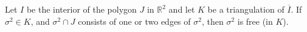 Let $I$ be the interior of the polygon $J$ in $\mathbb{R}^2$ and let $K$ be a triangulation of $\overline{I}$. If $\sigma^2 \in K$, and $\sigma^2 \cap J$ consists of one or two edges of $\sigma^2$, then $\sigma^2$ is free (in $K$).
